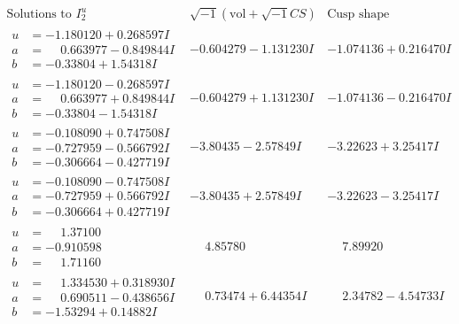 \documentclass[1p]{elsarticle_modified}
\theoremstyle{definition}
\newcommand{\I}{\sqrt{-1}}
\begin{document}
$$\begin{array}{c|c|c}  
\text{Solutions to }I^u_{2}& \I (\text{vol} + \sqrt{-1}CS) & \text{Cusp shape}\\
 \hline 
\begin{aligned}
u &= -1.180120 + 0.268597 I \\
a &= \phantom{-}0.663977 - 0.849844 I \\
b &= -0.33804 + 1.54318 I\end{aligned}
 & -0.604279 - 1.131230 I & -1.074136 + 0.216470 I \\ \hline\begin{aligned}
u &= -1.180120 - 0.268597 I \\
a &= \phantom{-}0.663977 + 0.849844 I \\
b &= -0.33804 - 1.54318 I\end{aligned}
 & -0.604279 + 1.131230 I & -1.074136 - 0.216470 I \\ \hline\begin{aligned}
u &= -0.108090 + 0.747508 I \\
a &= -0.727959 - 0.566792 I \\
b &= -0.306664 - 0.427719 I\end{aligned}
 & -3.80435 - 2.57849 I & -3.22623 + 3.25417 I \\ \hline\begin{aligned}
u &= -0.108090 - 0.747508 I \\
a &= -0.727959 + 0.566792 I \\
b &= -0.306664 + 0.427719 I\end{aligned}
 & -3.80435 + 2.57849 I & -3.22623 - 3.25417 I \\ \hline\begin{aligned}
u &= \phantom{-}1.37100\phantom{ +0.000000I} \\
a &= -0.910598\phantom{ +0.000000I} \\
b &= \phantom{-}1.71160\phantom{ +0.000000I}\end{aligned}
 & \phantom{-}4.85780\phantom{ +0.000000I} & \phantom{-}7.89920\phantom{ +0.000000I} \\ \hline\begin{aligned}
u &= \phantom{-}1.334530 + 0.318930 I \\
a &= \phantom{-}0.690511 - 0.438656 I \\
b &= -1.53294 + 0.14882 I\end{aligned}
 & \phantom{-}0.73474 + 6.44354 I & \phantom{-}2.34782 - 4.54733 I \\ \hline\begin{aligned}

\end{aligned}
\end{array}$$
\end{document}

